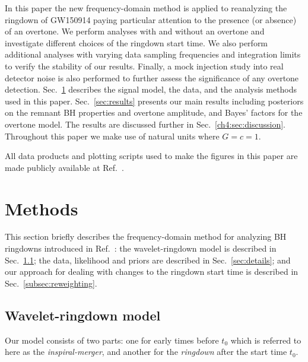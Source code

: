 In this paper the new frequency-domain method is applied to reanalyzing the ringdown of GW150914 paying particular attention to the presence (or absence) of an overtone. 
We perform analyses with and without an overtone and investigate different choices of the ringdown start time. 
We also perform additional analyses with varying data sampling frequencies and integration limits to verify the stability of our results. Finally, a mock injection study into real detector noise is also performed to further assess the significance of any overtone detection.
Sec.~\ref{sec:analysis} describes the signal model, the data, and the analysis methods used in this paper.
Sec.~\ref{sec:results} presents our main results including posteriors on the remnant BH properties and overtone amplitude, and Bayes' factors for the overtone model.
The results are discussed further in Sec.~\ref{ch4:sec:discussion}.
Throughout this paper we make use of natural units where $G=c=1$.

All data products and plotting scripts used to make the figures in this paper are made publicly available at Ref.~\cite{finch_eliot_2022_6949492}.


\section{Methods}\label{sec:analysis}

This section briefly describes the frequency-domain method for analyzing BH ringdowns introduced in Ref.~\cite{Finch:2021qph}:
the wavelet-ringdown model is described in Sec.~\ref{sec:model}; the data, likelihood and priors are described in Sec.~\ref{sec:details}; and our approach for dealing with changes to the ringdown start time is described in Sec.~\ref{subsec:reweighting}.


\subsection{Wavelet-ringdown model}\label{sec:model}

Our model consists of two parts: one for early times before $t_0$ which is referred to here as the \emph{inspiral-merger}, and another for the \emph{ringdown} after the start time $t_0$.

